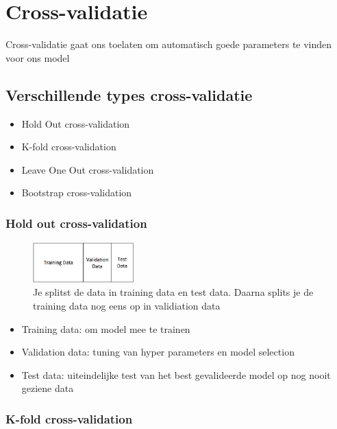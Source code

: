 \documentclass{article}
\begin{document}
\section{Cross-validatie}

Cross-validatie gaat ons toelaten om automatisch goede parameters te vinden voor ons model

\subsection{Verschillende types cross-validatie}

\begin{itemize}
    \item Hold Out cross-validation
    \item K-fold cross-validation
    \item Leave One Out cross-validation
    \item Bootstrap cross-validation
\end{itemize}

\subsubsection{Hold out cross-validation}

\begin{figure}[H]
    \centering
    \includegraphics[width=0.35\textwidth]{cross-validation-holdout.png}
    \caption{Je splitst de data in training data en test data. Daarna splits je de training data nog eens op in validiation data}
\end{figure}

\begin{itemize}
    \item Training data: om model mee te trainen
    \item Validation data: tuning van hyper parameters en model selection
    \item Test data: uiteindelijke test van het best gevalideerde model op nog nooit geziene data
\end{itemize}

\subsubsection{K-fold cross-validation}
\end{document}
